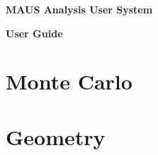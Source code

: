 \documentclass[a4paper, 10pt] {report}
\begin{document}
\vspace*{2.0cm}

\begin{center}
\Large{ \bf{MAUS Analysis User System} }

\Large{ \bf{User Guide} }
\end{center}

%

%

\chapter{Monte Carlo}


%
%
%
%
%

\chapter{Geometry}

%


\end{document}
